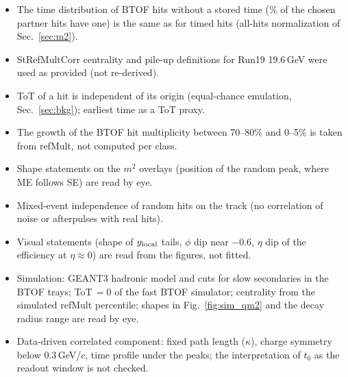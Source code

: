 \begin{itemize}
\item The time distribution of BTOF hits without a stored time (\mtMETimedFracVthree\% of the chosen partner hits have one)
  is the same as for timed hits (all-hits normalization of Sec.~\ref{sec:m2}).
\item StRefMultCorr centrality and pile-up definitions for Run19 19.6\,GeV were used as provided (not re-derived).
\item ToT of a hit is independent of its origin (equal-chance emulation, Sec.~\ref{sec:bkg}); earliest time as a ToT proxy.
\item The growth of the BTOF hit multiplicity between 70--80\% and 0--5\% is taken from refMult, not computed per class.
\item Shape statements on the $m^2$ overlays (position of the random peak, where ME follows SE) are read by eye.
\item Mixed-event independence of random hits on the track (no correlation of noise or afterpulses with real hits).
\item Visual statements (shape of $y_{\rm local}$ tails, $\phi$ dip near $-0.6$, $\eta$ dip of the
  efficiency at $\eta\approx0$) are read from the figures, not fitted.
\item Simulation: GEANT3 hadronic model and cuts for slow secondaries in the BTOF trays; ToT$\,=0$ of the fast BTOF simulator;
  centrality from the simulated refMult percentile; shapes in Fig.~\ref{fig:sim_qm2} and the decay radius range are read by eye.
\item Data-driven correlated component: fixed path length ($\kappa$), charge symmetry below 0.3\,GeV/$c$, time profile under the peaks;
  the interpretation of $t_0$ as the readout window is not checked.
\end{itemize}
